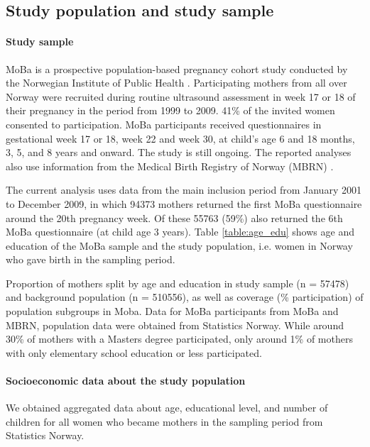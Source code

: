 \documentclass[12pt]{article}
\begin{document}
\subsection{Study population and study sample}

\paragraph{Study sample} MoBa is a prospective population-based pregnancy cohort study conducted by the Norwegian Institute of Public Health  \cite{Magnus2006-jj,Magnus2016-ht}. Participating mothers from all over Norway were recruited during routine ultrasound assessment in week 17 or 18 of their pregnancy in the period from 1999 to 2009. 41\% of the invited women consented to participation. MoBa participants received questionnaires in gestational week 17 or 18, week 22 and week 30, at child's age 6 and 18 months, 3, 5, and 8 years and onward. The study is still ongoing. The reported analyses also use information from the Medical Birth Registry of Norway (MBRN) \cite{Irgens2000-ra}.

The current analysis uses data from the main inclusion period from January 2001 to December 2009, in which 94373 mothers returned the first MoBa questionnaire around the 20th pregnancy week. Of these 55763 (59\%) also returned the 6th MoBa questionnaire (at child age 3 years). Table \ref{table:age_edu} shows age and education of the MoBa sample and the study population, i.e. women in Norway who gave birth in the sampling period.

\begin{table}[ht]
	\caption{Proportion of mothers split by age and education in study sample (n = 57478) and background population (n = 510556), as well as coverage (\% participation) of population subgroups in Moba. Data for MoBa participants from MoBa and MBRN, population data were obtained from Statistics Norway. While around 30\% of mothers with a Masters degree participated, only around 1\% of mothers with only elementary school education or less participated.} 
	\label{table:age_edu}
\end{table}

\paragraph{Socioeconomic data about the study population}
We obtained aggregated data about age, educational level, and number of children for all women who became mothers in the sampling period from Statistics Norway. 
\end{document}
